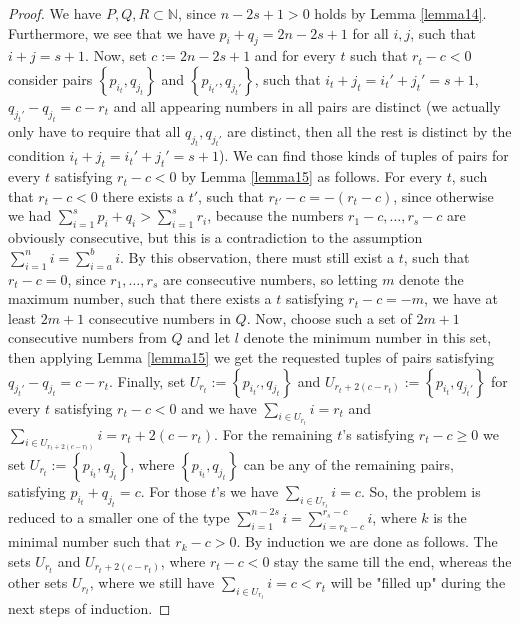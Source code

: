 \begin{thm}
\begin{proof}
We have \(P,Q,R\subset\mathbb{N}\), since \(n-2s+1>0\) holds by Lemma \ref{lemma14}. Furthermore, we see that we have \(p_i+q_j=2n-2s+1\) for all \(i,j\), such that \(i+j=s+1\). Now, set \(c:=2n-2s+1\) and for every \(t\) such that \(r_t-c<0\) consider pairs \(\left\{p_{i_t},q_{j_t}\right\}\) and \(\left\{p_{i_t'},q_{j_t'}\right\}\), such that \(i_t+j_t=i_t'+j_t'=s+1\), \(q_{j_t'}-q_{j_t}=c-r_t\) and all appearing numbers in all pairs are distinct (we actually only have to require that all \(q_{j_t},q_{j_t'}\) are distinct, then all the rest is distinct by the condition \(i_t+j_t=i_t'+j_t'=s+1\)). We can find those kinds of tuples of pairs for every \(t\) satisfying \(r_t-c<0\) by Lemma \ref{lemma15} as follows. For every \(t\), such that \(r_t-c<0\) there exists a \(t'\), such that \(r_{t'}-c=-(r_t-c)\), since otherwise we had \(\sum\limits_{i=1}^sp_i+q_i>\sum\limits_{i=1}^sr_i\), because the numbers \(r_1-c,\ldots,r_s-c\) are obviously consecutive, but this is a contradiction to the assumption \(\sum\limits_{i=1}^ni=\sum\limits_{i=a}^bi\). By this observation, there must still exist a \(t\), such that \(r_t-c=0\), since \(r_1,\ldots,r_s\) are consecutive numbers, so letting \(m\) denote the maximum number, such that there exists a \(t\) satisfying \(r_t-c=-m\), we have at least \(2m+1\) consecutive numbers in \(Q\). Now, choose such a set of \(2m+1\) consecutive numbers from \(Q\) and let \(l\) denote the minimum number in this set, then applying Lemma \ref{lemma15} we get the requested tuples of pairs satisfying \(q_{j_t'}-q_{j_t}=c-r_t\). Finally, set \(U_{r_t}:=\left\{p_{i_t'},q_{j_t}\right\}\) and \(U_{r_t+2(c-r_t)}:=\left\{p_{i_t},q_{j_t'}\right\}\) for every \(t\) satisfying \(r_t-c<0\) and we have \(\sum\limits_{i\in U_{r_t}}i=r_t\) and \(\sum\limits_{i\in U_{r_t+2(c-r_t)}}i=r_t+2(c-r_t)\). For the remaining \(t\)'s satisfying \(r_t-c\geq 0\) we set \(U_{r_t}:=\left\{p_{i_t},q_{j_t}\right\}\), where \(\left\{p_{i_t},q_{j_t}\right\}\) can be any of the remaining pairs, satisfying \(p_{i_t}+q_{j_t}=c\). For those \(t\)'s we have \(\sum\limits_{i\in U_{r_t}}i=c\). So, the problem is reduced to a smaller one of the type \(\sum\limits_{i=1}^{n-2s}i=\sum\limits_{i=r_k-c}^{r_s-c}i\), where \(k\) is the minimal number such that \(r_k-c>0\). By induction we are done as follows. The sets \(U_{r_t}\) and \(U_{r_t+2(c-r_t)}\), where \(r_t-c<0\) stay the same till the end, whereas the other sets \(U_{r_t}\), where we still have \(\sum\limits_{i\in U_{r_t}}i=c<r_t\) will be "filled up" during the next steps of induction.
\end{proof}
\end{thm}
